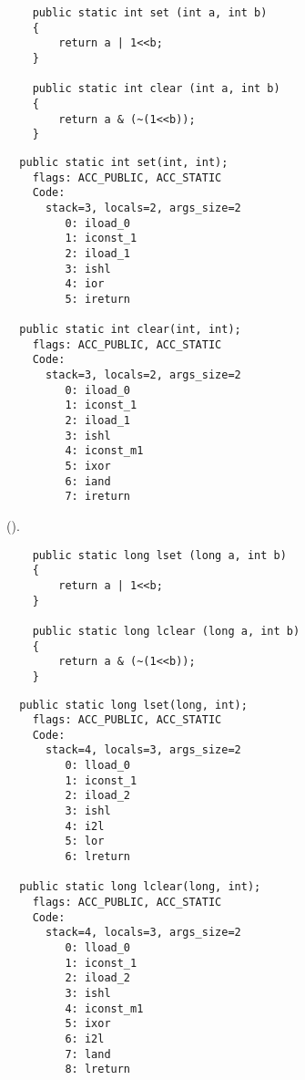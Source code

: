 

\begin{lstlisting}
	public static int set (int a, int b) 
	{
		return a | 1<<b;
	}

	public static int clear (int a, int b) 
	{
		return a & (~(1<<b));
	}
\end{lstlisting}

\begin{lstlisting}
  public static int set(int, int);
    flags: ACC_PUBLIC, ACC_STATIC
    Code:
      stack=3, locals=2, args_size=2
         0: iload_0       
         1: iconst_1      
         2: iload_1       
         3: ishl          
         4: ior           
         5: ireturn       

  public static int clear(int, int);
    flags: ACC_PUBLIC, ACC_STATIC
    Code:
      stack=3, locals=2, args_size=2
         0: iload_0       
         1: iconst_1      
         2: iload_1       
         3: ishl          
         4: iconst_m1     
         5: ixor          
         6: iand          
         7: ireturn       
\end{lstlisting}

 ().


\begin{lstlisting}
	public static long lset (long a, int b) 
	{
		return a | 1<<b;
	}

	public static long lclear (long a, int b) 
	{
		return a & (~(1<<b));
	}
\end{lstlisting}

\begin{lstlisting}
  public static long lset(long, int);
    flags: ACC_PUBLIC, ACC_STATIC
    Code:
      stack=4, locals=3, args_size=2
         0: lload_0       
         1: iconst_1      
         2: iload_2       
         3: ishl          
         4: i2l           
         5: lor           
         6: lreturn       

  public static long lclear(long, int);
    flags: ACC_PUBLIC, ACC_STATIC
    Code:
      stack=4, locals=3, args_size=2
         0: lload_0       
         1: iconst_1      
         2: iload_2       
         3: ishl          
         4: iconst_m1     
         5: ixor          
         6: i2l           
         7: land          
         8: lreturn       
\end{lstlisting}

